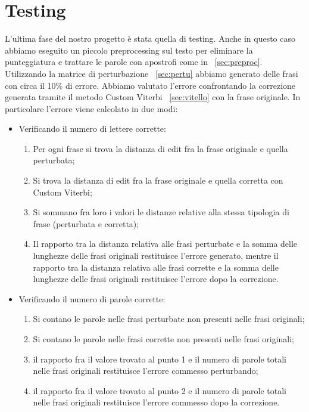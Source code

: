 \section{Testing}
L'ultima fase del nostro progetto è stata quella di testing. Anche in questo caso abbiamo eseguito un piccolo preprocessing sul testo per eliminare la punteggiatura e trattare le parole con apostrofi come in  ~\ref{sec:preproc}. Utilizzando la matrice di perturbazione ~\ref{sec:pertu} abbiamo generato delle frasi con circa il 10\% di errore. Abbiamo valutato l'errore confrontando la correzione generata tramite il metodo Custom Viterbi ~\ref{sec:vitello} con la frase originale.   In particolare l'errore viene calcolato in due modi:
\begin{itemize}
\item Verificando il numero di lettere corrette:
\begin{enumerate}
\item Per ogni frase si trova la distanza di edit fra la frase originale e quella perturbata;
\item Si trova la distanza di edit fra la frase originale e quella corretta con Custom Viterbi;
\item Si sommano fra loro i valori le distanze relative alla stessa tipologia di frase (perturbata e corretta);
\item Il rapporto tra la distanza relativa alle frasi perturbate e la somma delle lunghezze delle frasi originali restituisce l'errore generato, mentre il rapporto tra la distanza relativa alle frasi corrette e la somma delle lunghezze delle frasi originali restituisce l'errore dopo la correzione.
\end{enumerate}
\item Verificando il numero di parole corrette:
\begin{enumerate}
\item Si contano le parole nelle frasi perturbate non  presenti  nelle frasi originali;
\item Si contano le parole nelle frasi corrette non presenti nelle frasi originali;
\item il rapporto fra il valore trovato al punto 1 e il numero di parole totali nelle frasi originali restituisce l'errore commesso perturbando;
\item il rapporto fra il valore trovato al punto 2 e il numero di parole totali nelle frasi originali restituisce l'errore commesso dopo la correzione.
\end{enumerate}
\end{itemize}

